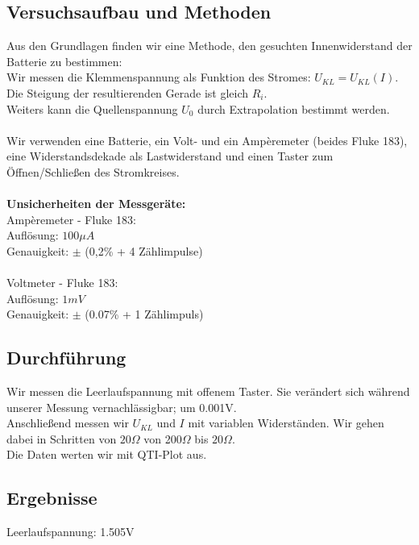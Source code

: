 \documentclass{article}
\begin{document}
\subsection{Versuchsaufbau und Methoden}
Aus den Grundlagen finden wir eine Methode, den gesuchten Innenwiderstand der Batterie zu bestimmen:\\
Wir messen die Klemmenspannung als Funktion des Stromes: $U_{KL}=U_{KL}(I)$. Die Steigung der resultierenden Gerade ist gleich $R_i$.\\
Weiters kann die Quellenspannung $U_0$ durch Extrapolation bestimmt werden.\\
\\
Wir verwenden eine Batterie, ein Volt- und ein Ampèremeter (beides Fluke 183), eine Widerstandsdekade als Lastwiderstand und einen Taster zum Öffnen/Schließen des Stromkreises.\\
\\
\textbf{Unsicherheiten der Messgeräte:} \\
Ampèremeter - Fluke 183:\\
Auflösung: $100\mu A$\\
Genauigkeit: $\pm$ (0,2\% + 4 Zählimpulse)\\
\\
Voltmeter - Fluke 183:\\
Auflösung: $1mV$\\
Genauigkeit: $\pm$ (0.07\% + 1 Zählimpuls)


\subsection{Durchführung}
Wir messen die Leerlaufspannung mit offenem Taster. Sie verändert sich während unserer Messung vernachlässigbar; um 0.001V.\\ 
Anschließend messen wir $U_{KL}$ und $I$ mit variablen Widerständen. Wir gehen dabei in Schritten von $20\Omega$ von 200$\Omega$ bis $20\Omega$.\\
Die Daten werten wir mit QTI-Plot aus.

\newpage
\subsection{Ergebnisse}
Leerlaufspannung: 1.505V\\
\\
\end{document}
